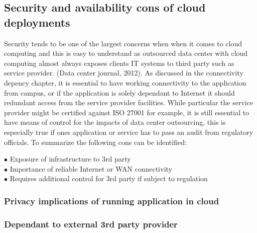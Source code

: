 \documentclass{article}
\begin{document}
\subsection{Security and availability cons of cloud deployments}
Security tends to be one of the largest concerns when when it comes to cloud computing and this is easy to understand as outsourced data center with cloud computing almost always exposes clients IT systems to third party such as service provider. (Data center journal, 2012). As discussed in the connectivity depency chapter, it is essential to have working connectivity to the application from campus, or if the application is solely dependant to Internet it should redundant access from the service provider facilities. While particular the service provider might be certified against ISO 27001 for example, it is still essential to have means of control for the impacts of data center outsourcing, this is especially true if ones application or service has to pass an audit from regulatory officials. To summarize the following cons can be identified:
\begin{description}
	\item[$\bullet$ Exposure of infrastructure to 3rd party]
	\item[$\bullet$ Importance of reliable Internet or WAN connectivity]
	\item[$\bullet$ Requires additional control for 3rd party if subject to regulation]
\end{description}
\subsubsection{Privacy implications of running application in cloud}
\subsubsection{Dependant to external 3rd party provider}
\end{document}
